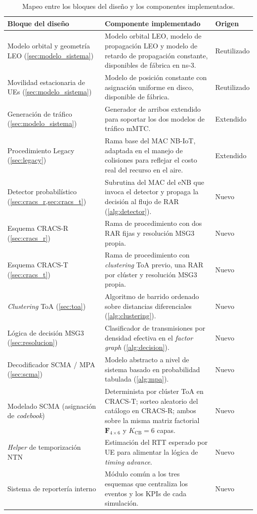\begin{table}[H]
\centering
\caption{Mapeo entre los bloques del diseño y los componentes implementados.}
\label{tab:impl_componentes}
\scriptsize
\renewcommand{\arraystretch}{1.2}
\begin{tabularx}{\textwidth}{@{}>{\raggedright\arraybackslash}p{4.5cm} Y >{\raggedright\arraybackslash}p{2.0cm}@{}}
\toprule
\textbf{Bloque del diseño} & \textbf{Componente implementado} & \textbf{Origen} \\
\midrule
Modelo orbital y geometría LEO (\cref{sec:modelo_sistema}) & Modelo orbital LEO, modelo de propagación LEO y modelo de retardo de propagación constante, disponibles de fábrica en ns-3. & Reutilizado \\
Movilidad estacionaria de UEs (\cref{sec:modelo_sistema}) & Modelo de posición constante con asignación uniforme en disco, disponible de fábrica. & Reutilizado \\
\midrule
Generación de tráfico (\cref{sec:modelo_sistema}) & Generador de arribos extendido para soportar los dos modelos de tráfico mMTC. & Extendido \\
Procedimiento Legacy (\cref{sec:legacy}) & Rama base del MAC NB-IoT, adaptada en el manejo de colisiones para reflejar el costo real del recurso en el aire. & Extendido \\
\midrule
Detector probabilístico (\cref{sec:cracs_r,sec:cracs_t}) & Subrutina del MAC del eNB que invoca el detector y propaga la decisión al flujo de RAR (\cref{alg:detector}). & Nuevo \\
Esquema CRACS-R (\cref{sec:cracs_r}) & Rama de procedimiento con dos RAR fijas y resolución MSG3 propia. & Nuevo \\
Esquema CRACS-T (\cref{sec:cracs_t}) & Rama de procedimiento con \emph{clustering} ToA previo, una RAR por clúster y resolución MSG3 propia. & Nuevo \\
\emph{Clustering} ToA (\cref{sec:toa}) & Algoritmo de barrido ordenado sobre distancias diferenciales (\cref{alg:clustering}). & Nuevo \\
Lógica de decisión MSG3 (\cref{sec:resolucion}) & Clasificador de transmisiones por densidad efectiva en el \emph{factor graph} (\cref{alg:decision}). & Nuevo \\
Decodificador SCMA / MPA (\cref{sec:scma}) & Modelo abstracto a nivel de sistema basado en probabilidad tabulada (\cref{alg:mpa}). & Nuevo \\
Modelado SCMA (asignación de \emph{codebook}) & Determinista por clúster ToA en CRACS-T; sorteo aleatorio del catálogo en CRACS-R; ambos sobre la misma matriz factorial $\mathbf{F}_{4\times6}$ y $K_{\text{CB}}=6$ capas. & Nuevo \\
\emph{Helper} de temporización NTN & Estimación del RTT esperado por UE para alimentar la lógica de \emph{timing advance}. & Nuevo \\
Sistema de reportería interno & Módulo común a los tres esquemas que centraliza los eventos y los KPIs de cada simulación. & Nuevo \\
\bottomrule
\end{tabularx}
\end{table}

